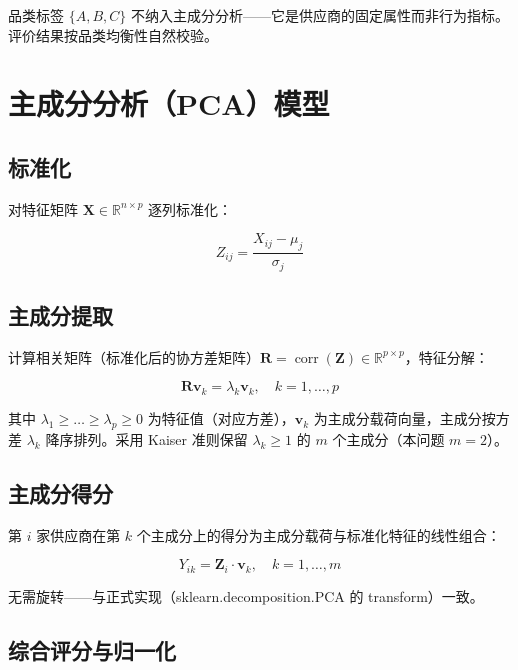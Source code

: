 \documentclass{internal-report}
\begin{document}
品类标签 $\{A, B, C\}$ 不纳入主成分分析——它是供应商的固定属性而非行为指标。评价结果按品类均衡性自然校验。

\section{主成分分析（PCA）模型}

\subsection{标准化}

对特征矩阵 $\mathbf{X} \in \mathbb{R}^{n \times p}$ 逐列标准化：

\begin{equation}
    Z_{ij} = \frac{X_{ij} - \mu_j}{\sigma_j}
\end{equation}

\subsection{主成分提取}

计算相关矩阵（标准化后的协方差矩阵）$\mathbf{R} = \operatorname{corr}(\mathbf{Z}) \in \mathbb{R}^{p \times p}$，特征分解：

\begin{equation}
    \mathbf{R} \mathbf{v}_k = \lambda_k \mathbf{v}_k, \quad k = 1, \dots, p
\end{equation}

其中 $\lambda_1 \ge \dots \ge \lambda_p \ge 0$ 为特征值（对应方差），$\mathbf{v}_k$ 为主成分载荷向量，主成分按方差 $\lambda_k$ 降序排列。采用 Kaiser 准则保留 $\lambda_k \ge 1$ 的 $m$ 个主成分（本问题 $m = 2$）。

\subsection{主成分得分}

第 $i$ 家供应商在第 $k$ 个主成分上的得分为主成分载荷与标准化特征的线性组合：

\begin{equation}
    Y_{ik} = \mathbf{Z}_i \cdot \mathbf{v}_k, \quad k = 1, \dots, m
\end{equation}

无需旋转——与正式实现（sklearn.decomposition.PCA 的 transform）一致。

\subsection{综合评分与归一化}
\end{document}
